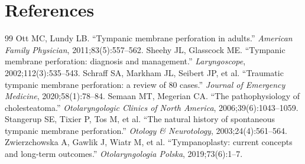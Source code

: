 \section*{References}
\begin{thebibliography}{99}
 Ott MC, Lundy LB. ``Tympanic membrane perforation in adults.'' \textit{American Family Physician}, 2011;83(5):557--562.
 Sheehy JL, Glasscock ME. ``Tympanic membrane perforation: diagnosis and management.'' \textit{Laryngoscope}, 2002;112(3):535--543.
 Schraff SA, Markham JL, Seibert JP, et al. ``Traumatic tympanic membrane perforation: a review of 80 cases.'' \textit{Journal of Emergency Medicine}, 2020;58(1):78--84.
 Semaan MT, Megerian CA. ``The pathophysiology of cholesteatoma.'' \textit{Otolaryngologic Clinics of North America}, 2006;39(6):1043--1059.
 Stangerup SE, Tixier P, Tos M, et al. ``The natural history of spontaneous tympanic membrane perforation.'' \textit{Otology \& Neurotology}, 2003;24(4):561--564.
 Zwierzchowska A, Gawlik J, Wiatr M, et al. ``Tympanoplasty: current concepts and long-term outcomes.'' \textit{Otolaryngologia Polska}, 2019;73(6):1--7.

\end{thebibliography}
